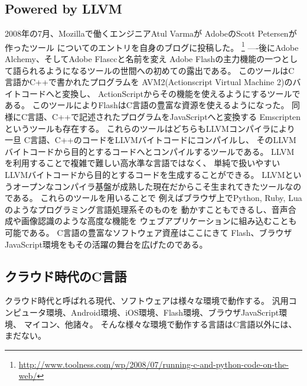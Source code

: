 \subsection{Powered by LLVM} %
2008年の7月、Mozillaで働くエンジニアAtul Varmaが
AdobeのScott Petersenが作ったツール
についてのエントリを自身のブログに投稿した。
\footnote{\url{http://www.toolness.com/wp/2008/07/running-c-and-python-code-on-the-web/}}
----後にAdobe Alchemy、そしてAdobe Flasccと名前を変え
Adobe Flashの主力機能の一つとして語られるようになるツールの世間への初めての露出である。
このツールはC言語かC++で書かれたプログラムを
AVM2(Actionscript Virtual Machine 2)のバイトコードへと変換し、
ActionScriptからその機能を使えるようにするツールである。
このツールによりFlashはC言語の豊富な資源を使えるようになった。
同様にC言語、C++で記述されたプログラムをJavaScriptへと変換する
Emscriptenというツールも存在する。
これらのツールはどちらもLLVMコンパイラにより一旦
C言語、C++のコードをLLVMバイトコードにコンパイルし、
そのLLVMバイトコードから目的とするコードへとコンパイルするツールである。
LLVMを利用することで複雑で難しい高水準な言語ではなく、
単純で扱いやすいLLVMバイトコードから目的とするコードを生成することができる。
LLVMというオープンなコンパイラ基盤が成熟した現在だからこそ生まれてきたツールなのである。
これらのツールを用いることで
例えばブラウザ上でPython, Ruby, Luaのようなプログラミング言語処理系そのものを
動かすこともできるし、音声合成や画像認識のような高度な機能を
ウェブアプリケーションに組み込むことも可能である。
C言語の豊富なソフトウェア資産はここにきて
Flash、ブラウザJavaScript環境をもその活躍の舞台を広げたのである。

\subsection{クラウド時代のC言語}
クラウド時代と呼ばれる現代、ソフトウェアは様々な環境で動作する。
汎用コンピュータ環境、Android環境、iOS環境、Flash環境、ブラウザJavaScript環境、
マイコン、他諸々。
そんな様々な環境で動作する言語はC言語以外には、まだない。

% 
% 
% 

